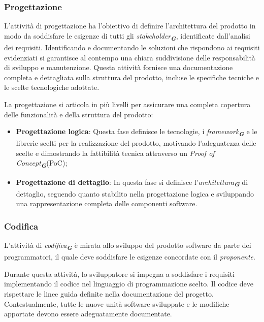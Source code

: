 \subsubsection{Progettazione}

L'attività di progettazione ha l'obiettivo di definire l'architettura del prodotto in modo da soddisfare le esigenze di tutti gli \emph{stakeholder}\textsubscript{\textit{\textbf{G}}}, identificate dall’analisi dei requisiti. Identificando e documentando le soluzioni che rispondono ai requisiti evidenziati si garantisce al contempo una chiara suddivisione delle responsabilità di sviluppo e manutenzione. Questa attività fornisce una documentazione completa e dettagliata sulla struttura del prodotto, incluse le specifiche tecniche e le scelte tecnologiche adottate. 

La progettazione si articola in più livelli per assicurare una completa copertura delle funzionalità e della struttura del prodotto:
\begin{itemize}
    \item \textbf{Progettazione logica}: Questa fase definisce le tecnologie, i \emph{framework}\textsubscript{\textit{\textbf{G}}} e le librerie scelti per la realizzazione del prodotto, motivando l'adeguatezza delle scelte e dimostrando la fattibilità tecnica attraverso un \emph{Proof of Concept}\textsubscript{\textit{\textbf{G}}}(PoC);
    \item \textbf{Progettazione di dettaglio}: In questa fase si definisce l'\emph{architettura}\textsubscript{\textit{\textbf{G}}} di dettaglio, seguendo quanto stabilito nella progettazione logica e sviluppando una rappresentazione completa delle componenti software.
\end{itemize}

\subsubsection{Codifica}

L’attività di \emph{codifica}\textsubscript{\textit{\textbf{G}}} è mirata allo sviluppo del prodotto software da parte dei programmatori, il quale deve soddisfare le esigenze concordate con il \emph{proponente}.


Durante questa attività, lo sviluppatore si impegna a soddisfare i requisiti implementando il codice nel linguaggio di programmazione scelto.
Il codice deve rispettare le linee guida definite nella documentazione del progetto. Contestualmente, tutte le nuove unità software sviluppate e le modifiche apportate devono essere adeguatamente documentate.

